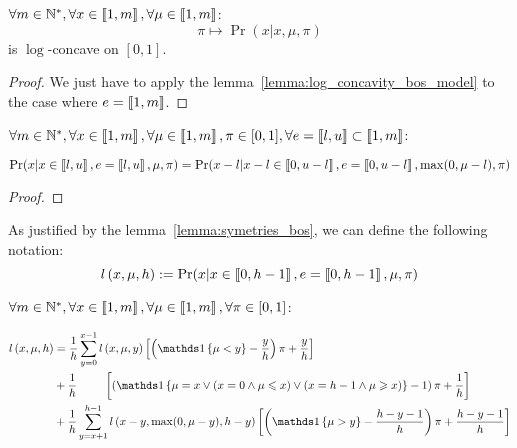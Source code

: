 \begin{thm}
    $\forall m \in \mathbb{N}^*, \forall x \in \left\llbracket1, m\right\rrbracket, \forall \mu \in \left\llbracket1, m\right\rrbracket$:
    \[\pi \mapsto \Pr(x | x, \mu, \pi) \] 
    is $\log$-concave on $[0, 1]$.
\end{thm}
\begin{proof}
    We just have to apply the lemma~\ref{lemma:log_concavity_bos_model} to the case where $e = \left\llbracket1, m\right\rrbracket$.
\end{proof}


\begin{lemma}
    \label{lemma:symetries_bos}
    $\forall m \in \mathbb{N}^*, \forall x \in \left\llbracket1, m\right\rrbracket, \forall \mu \in \left\llbracket1, m\right\rrbracket, \pi \in [0, 1], \forall e = \left\llbracket l, u\right\rrbracket \subset \left\llbracket1, m\right\rrbracket$:
    
    \[ \Pr(x | x \in \left\llbracket l, u\right\rrbracket, e = \left\llbracket l, u\right\rrbracket, \mu, \pi) = \Pr(x - l | x - l \in \left\llbracket0, u - l\right\rrbracket, e= \left\llbracket0, u - l\right\rrbracket, \max(0, \mu - l), \pi)\]
\end{lemma}
\begin{proof}
\end{proof}

\begin{definition}
    As justified by the lemma~\ref{lemma:symetries_bos}, we can define the following notation:
    \[ \mathnormal{l}\left(x, \mu, h\right) := \Pr(x | x \in \left\llbracket0, h - 1\right\rrbracket, e = \left\llbracket0, h - 1\right\rrbracket, \mu, \pi) \]
\end{definition}

\begin{thm}
    \label{thm:computing_likelihood_bos}
    $\forall m \in \mathbb{N}^*, \forall x \in \left\llbracket1, m\right\rrbracket, \forall \mu \in \left\llbracket1, m\right\rrbracket, \forall \pi \in [0, 1]$:

\begin{equation}
    \begin{aligned}
        \bosl{x}{\mu}{h}
        &=\frac{1}{h} \sum_{y = 0}^{x - 1} \bosl{x}{\mu}{y} \left[ \left( \indickronecker{\mu < y} - \frac{y}{h} \right) \pi + \frac{y}{h} \right] \\
        &+\frac{1}{h} \ \qquad \left[ \left( \indickronecker{\mu = x \lor (x = 0 \land \mu \leq x) \lor (x = h - 1 \land \mu \geq x)} - 1 \right) \pi +  \frac{1}{h} \right] \\
        &+\frac{1}{h} \sum_{y = x + 1}^{h - 1}\bosl{x - y}{\max(0, \mu - y)}{h - y}    \left[ \left( \indickronecker{\mu > y} - \frac{h - y - 1}{h} \right) \pi + \frac{h - y - 1}{h} \right]
    \end{aligned} \\
\end{equation}
\end{thm}


